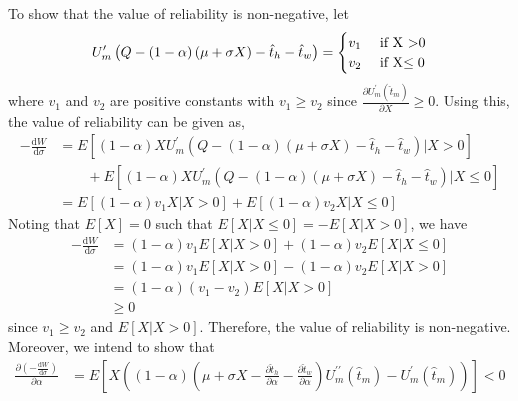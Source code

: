 \documentclass[12pt,a4paper,british]{article}
\makeatletter
\newenvironment{proof}[1][\proofname]{\par
    \normalfont\topsep6\p@\@plus6\p@\relax
    \trivlist
    \itemindent\parindent
    \item[\hskip\labelsep
          \scshape
      #1]\ignorespaces
  }{%
    \endtrivlist\@endpefalse
  }
\providecommand{\proofname}{Proof}
\makeatother
\begin{document}
\begin{proof}
To show that the value of reliability is non-negative, let
\begin{equation*}
U_{m}^{\prime}\left(Q-\left(1-\alpha\right)\left(\mu+\sigma X\right)-\hat{t}_{h}-\hat{t}_{w}\right)=\begin{cases}
v_{1} & \mbox{ if X >0}\\
v_{2} & \mbox{ if X\ensuremath{\leq0}}
\end{cases}
\end{equation*}%
where $v_{1}$ and $v_{2}$ are positive constants with $v_{1}\geq v_{2}$ since $\frac{\partial U_{m}^{\prime}\left(\hat{t}_{m}\right)}{\partial X} \geq 0$. Using this, the value of reliability can be given as,%
\begin{align*}
-\frac{\mathrm{d}W}{\mathrm{d}\sigma} & =E\left[\left(1-\alpha\right)XU_{m}^{\prime}\left(Q-\left(1-\alpha\right)\left(\mu+\sigma X\right)-\hat{t}_{h}-\hat{t}_{w}\right)\vert X>0\right]\\
 & \qquad+E\left[\left(1-\alpha\right)XU_{m}^{\prime}\left(Q-\left(1-\alpha\right)\left(\mu+\sigma X\right)-\hat{t}_{h}-\hat{t}_{w}\right)\vert X\leq0\right]\\
 & =E\left[\left(1-\alpha\right)v_{1}X\vert X>0\right]+E\left[\left(1-\alpha\right)v_{2}X\vert X\leq0\right]
\end{align*}%
Noting that $E\left[X\right]=0$ such that $E\left[X\vert X\leq0\right]=-E\left[X\vert X>0\right]$, we have
\begin{align*}
-\frac{\mathrm{d}W}{\mathrm{d}\sigma} & =\left(1-\alpha\right)v_{1}E\left[X\vert X>0\right]+\left(1-\alpha\right)v_{2}E\left[X\vert X\leq0\right]\\
 & =\left(1-\alpha\right)v_{1}E\left[X\vert X>0\right]-\left(1-\alpha\right)v_{2}E\left[X\vert X>0\right]\\
 & =\left(1-\alpha\right)\left(v_{1}-v_{2}\right)E\left[X\vert X>0\right]\\
 & \geq0
\end{align*}
since $v_{1}\geq v_{2}$ and $E\left[X\vert X>0\right]$. Therefore, the value of reliability is non-negative.
Moreover, we intend to show that
\begin{align*}
\frac{\partial\left(-\frac{\mathrm{d} W} {\mathrm{d} \sigma} \right)} {\partial\alpha} & = E\left[X\left(\left(1-\alpha\right)\left(\mu+\sigma X - \frac{\partial\hat{t}_{h}} {\partial\alpha}-\frac{\partial\hat{t}_{w}} {\partial\alpha} \right) U_{m}^{\prime\prime} \left(\hat{t}_{m} \right) - U_{m}^{\prime}\left( \hat{t}_{m} \right)\right)\right] < 0

\end{align*}
\end{proof}
\end{document}
